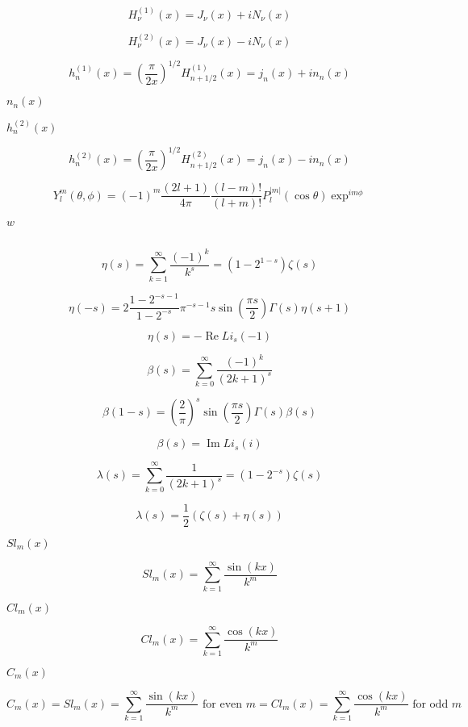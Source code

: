 \documentclass{article}
\begin{document}
\[ H^{(1)}_\nu(x) = J_\nu(x) + i N_\nu(x) \]
\pagebreak

\[ H^{(2)}_\nu(x) = J_\nu(x) - i N_\nu(x) \]
\pagebreak

\[ h^{(1)}_n(x) = \left(\frac{\pi}{2x} \right) ^{1/2} H^{(1)}_{n+1/2}(x) = j_n(x) + i n_n(x) \]
\pagebreak

$ n_n(x) $
\pagebreak

$ h^{(2)}_n(x) $
\pagebreak

\[ h^{(2)}_n(x) = \left(\frac{\pi}{2x} \right) ^{1/2} H^{(2)}_{n+1/2}(x) = j_n(x) - i n_n(x) \]
\pagebreak

\[ Y_l^m(\theta,\phi) = (-1)^m\frac{(2l+1)}{4\pi} \frac{(l-m)!}{(l+m)!} P_l^{|m|}(\cos\theta) \exp^{im\phi} \]
\pagebreak

$ w $
\pagebreak

\[ \]
\pagebreak

\[ \eta(s) = \sum_{k=1}^\infty \frac{(-1)^k}{k^s} = \left( 1 - 2^{1-s} \right) \zeta(s) \]
\pagebreak

\[ \eta(-s) = 2 \frac{1-2^{-s-1}}{1-2^{-s}} \pi^{-s-1} s \sin(\frac{\pi s}{2}) \Gamma(s) \eta(s+1) \]
\pagebreak

\[ \renewcommand\Re{\operatorname{Re}} \renewcommand\Im{\operatorname{Im}} \eta(s) = -\Re{Li_s(-1)} \]
\pagebreak

\[ \beta(s) = \sum_{k=0}^\infty \frac{(-1)^k}{(2k+1)^s} \]
\pagebreak

\[ \beta(1-s) = \left( \frac{2}{\pi}\right)^s \sin(\frac{\pi s}{2}) \Gamma(s) \beta(s) \]
\pagebreak

\[ \renewcommand\Re{\operatorname{Re}} \renewcommand\Im{\operatorname{Im}} \beta(s) = \Im{Li_s(i)} \]
\pagebreak

\[ \lambda(s) = \sum_{k=0}^\infty \frac{1}{(2k+1)^s} = \left( 1 - 2^{-s} \right) \zeta(s) \]
\pagebreak

\[ \lambda(s) = \frac{1}{2}(\zeta(s) + \eta(s)) \]
\pagebreak

$ Sl_m(x) $
\pagebreak

\[ Sl_m(x) = \sum_{k=1}^\infty\frac{\sin(kx)}{k^m} \]
\pagebreak

$ Cl_m(x) $
\pagebreak

\[ Cl_m(x) = \sum_{k=1}^\infty\frac{\cos(kx)}{k^m} \]
\pagebreak

$ C_m(x) $
\pagebreak

\[ C_m(x) = Sl_m(x) = \sum_{k=1}^\infty\frac{\sin(kx)}{k^m} \mbox{ for even } m = Cl_m(x) = \sum_{k=1}^\infty\frac{\cos(kx)}{k^m} \mbox{ for odd } m \]
\pagebreak
\end{document}
